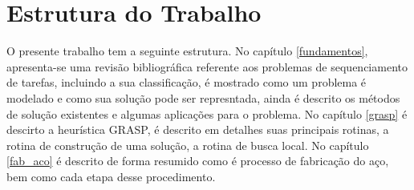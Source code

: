 \section{Estrutura do Trabalho}

O presente trabalho tem a seguinte estrutura. No capítulo \ref{fundamentos}, apresenta-se uma revisão bibliográfica referente aos problemas de sequenciamento de tarefas, incluindo a sua classificação, é mostrado como um problema é modelado e como sua solução pode ser represntada, ainda é descrito os métodos de solução existentes e algumas aplicações para o problema. No capítulo \ref{grasp} é descirto a heurística GRASP, é descrito em detalhes suas principais rotinas, a rotina de construção de uma solução, a rotina de busca local. No capítulo \ref{fab_aco} é descrito de forma resumido como é  processo de fabricação do aço, bem como cada etapa desse procedimento.



